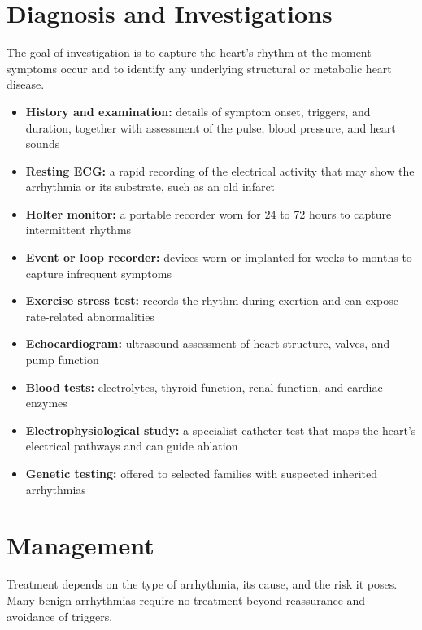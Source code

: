 \section*{Diagnosis and Investigations}
The goal of investigation is to capture the heart's rhythm at the moment symptoms occur and to identify any underlying structural or metabolic heart disease.

\begin{itemize}
    \item \textbf{History and examination:} details of symptom onset, triggers, and duration, together with assessment of the pulse, blood pressure, and heart sounds
    \item \textbf{Resting ECG:} a rapid recording of the electrical activity that may show the arrhythmia or its substrate, such as an old infarct
    \item \textbf{Holter monitor:} a portable recorder worn for 24 to 72 hours to capture intermittent rhythms
    \item \textbf{Event or loop recorder:} devices worn or implanted for weeks to months to capture infrequent symptoms
    \item \textbf{Exercise stress test:} records the rhythm during exertion and can expose rate-related abnormalities
    \item \textbf{Echocardiogram:} ultrasound assessment of heart structure, valves, and pump function
    \item \textbf{Blood tests:} electrolytes, thyroid function, renal function, and cardiac enzymes
    \item \textbf{Electrophysiological study:} a specialist catheter test that maps the heart's electrical pathways and can guide ablation
    \item \textbf{Genetic testing:} offered to selected families with suspected inherited arrhythmias
\end{itemize}

\section*{Management}
Treatment depends on the type of arrhythmia, its cause, and the risk it poses. Many benign arrhythmias require no treatment beyond reassurance and avoidance of triggers.

